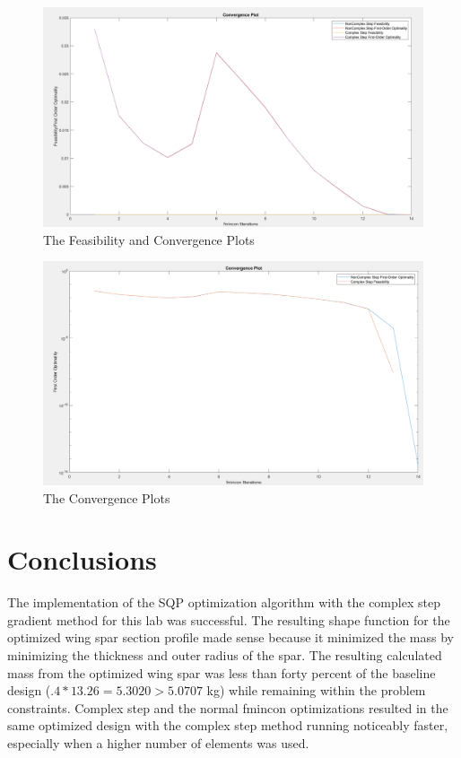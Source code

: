 \documentclass[11pt]{article}%
\begin{document}
\begin{figure}[h!]
    \centering
    \includegraphics[width=0.75\linewidth]{feas.png}
    \caption{ The Feasibility and Convergence Plots }
    \label{fig:feas}
\end{figure}
\begin{figure}[h!]
    \centering
    \includegraphics[width=0.75\linewidth]{converg.png}
    \caption{ The Convergence Plots }
    \label{fig:feas2}
\end{figure}
\medskip

\section{Conclusions}
The implementation of the SQP optimization algorithm with the complex step gradient method for this lab was successful. The resulting shape function for the optimized wing spar section profile made sense because it minimized the mass by minimizing the thickness and outer radius of the spar. The resulting calculated mass from the optimized wing spar was less than forty percent of the baseline design ($.4*13.26=5.3020 > 5.0707 $ kg) while remaining within the problem constraints. Complex step and the normal fmincon optimizations resulted in the same optimized design with the complex step method running noticeably faster, especially when a higher number of elements was used.
\end{document}
